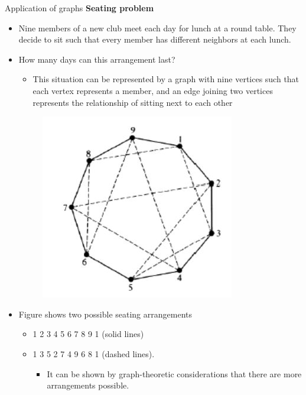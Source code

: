 \documentclass{beamer}
\begin{document}
\begin{frame}{Application of graphs}
	\textbf{Seating problem}
	\begin{itemize}
		\item Nine members of a new club meet each day for lunch at a round table. They decide
		to sit such that every member has different neighbors at each lunch.
		\item  How many days can this arrangement last?
		\begin{itemize}
			\item This situation can be represented by a graph with nine vertices such that each vertex
			represents a member, and an edge joining two vertices represents the relationship of sitting
			next to each other
		\end{itemize}
		\begin{figure}
			\includegraphics[scale=.3]{img/m12}
		\end{figure}
		\item  Figure shows two possible seating arrangements
		\begin{itemize}
			\item 1 2 3 4 5 6 7 8 9 1 (solid lines)
			\item 1 3 5 2 7 4 9 6 8 1 (dashed lines).
			\begin{itemize}
				\item  It can be shown by graph-theoretic
				considerations that there are more arrangements possible.
			\end{itemize}
		\end{itemize}
	\end{itemize}
\end{frame}
\end{document}
